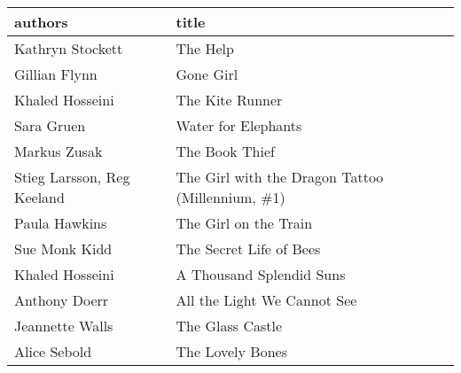 \begin{tabular}{ll}
\toprule
                    authors &                                             title \\
\midrule
           Kathryn Stockett &                                          The Help \\
              Gillian Flynn &                                         Gone Girl \\
            Khaled Hosseini &                                   The Kite Runner \\
                 Sara Gruen &                               Water for Elephants \\
               Markus Zusak &                                    The Book Thief \\
 Stieg Larsson, Reg Keeland &  The Girl with the Dragon Tattoo (Millennium, \#1) \\
              Paula Hawkins &                             The Girl on the Train \\
              Sue Monk Kidd &                           The Secret Life of Bees \\
            Khaled Hosseini &                          A Thousand Splendid Suns \\
              Anthony Doerr &                       All the Light We Cannot See \\
            Jeannette Walls &                                  The Glass Castle \\
               Alice Sebold &                                  The Lovely Bones \\
\bottomrule
\end{tabular}
